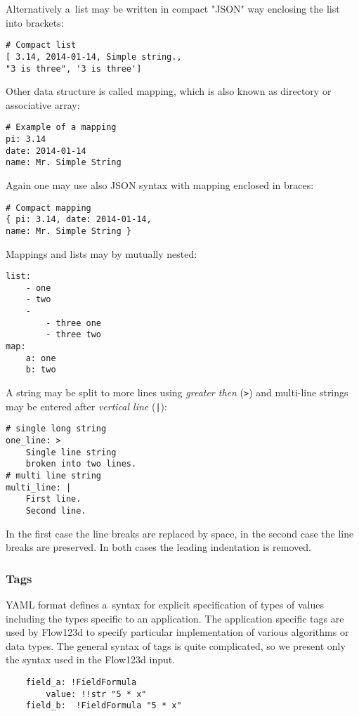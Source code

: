 Alternatively a~list may be written in compact "JSON" way enclosing the list into brackets:
\begin{verbatim}
# Compact list
[ 3.14, 2014-01-14, Simple string.,
"3 is three", '3 is three'] 
\end{verbatim}

Other data structure is called mapping, which is also known as directory or associative array:
\begin{verbatim}
# Example of a mapping
pi: 3.14
date: 2014-01-14   
name: Mr. Simple String
\end{verbatim}

Again one may use also JSON syntax with mapping enclosed in braces:
\begin{verbatim}
# Compact mapping
{ pi: 3.14, date: 2014-01-14,   
name: Mr. Simple String }
\end{verbatim}

Mappings and lists may by mutually nested:
\begin{verbatim}
list:
    - one
    - two
    - 
        - three one 
        - three two
map:
    a: one 
    b: two
\end{verbatim}

A string may be split to more lines using {\it greater then} (\verb'>') and multi-line strings may be entered after {\it vertical line} (\verb'|'):
\begin{verbatim}
# single long string
one_line: >
    Single line string
    broken into two lines.
# multi line string
multi_line: |
    First line.
    Second line.
\end{verbatim}
In the first case the line breaks are replaced by space, in the second case the line breaks are preserved.
In both cases the leading indentation is removed.


\subsubsection{Tags}
YAML format defines a~syntax for explicit specification of types of values including the types specific to an application.
The application specific tags are used by Flow123d to specify particular implementation of various algorithms or data types.
The general syntax of tags is quite complicated, so we present only the syntax used in the Flow123d input.
\begin{verbatim}
    field_a: !FieldFormula
        value: !!str "5 * x" 
    field_b:  !FieldFormula "5 * x"   
\end{verbatim}

